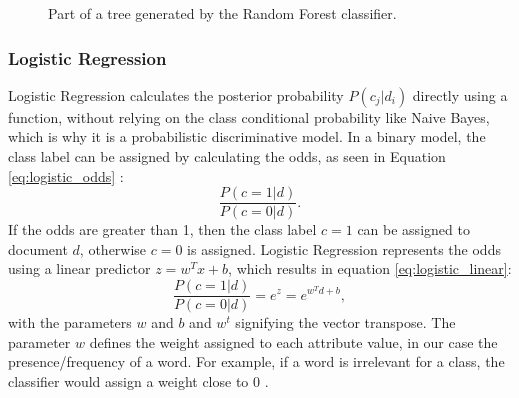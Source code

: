         \begin{figure}
        \centering
    \caption{Part of a tree generated by the Random Forest classifier.}
      \label{fig:tree}
\end{figure}
\subsubsection{Logistic Regression}

Logistic Regression calculates the posterior probability $P(c_j|d_i)$ directly using a function, without relying on the class conditional probability like Naive Bayes, which is why it is a probabilistic discriminative model. In a binary model, the class label can be assigned by calculating the odds, as seen in Equation \eqref{eq:logistic_odds} \cite{DBLP:books/aw/TanSKK2019}:
        \begin{equation}
            \label{eq:logistic_odds}
                \frac{P(c=1|d)}{P(c=0|d)}.
        \end{equation}
If the odds are greater than 1, then the class label $c=1$ can be assigned to document $d$, otherwise $c=0$ is assigned. Logistic Regression represents the odds using a linear predictor $z=w^Tx + b$, which results in equation \eqref{eq:logistic_linear}:
        \begin{equation}
            \label{eq:logistic_linear}
                \frac{P(c=1|d)}{P(c=0|d)} = e^z = e^{w^Td+b},
        \end{equation}
with the parameters $w$ and $b$ and $w^t$ signifying the vector transpose. The parameter $w$ defines the weight assigned to each attribute value, in our case the presence/frequency of a word. For example, if a word is irrelevant for a class, the classifier would assign a weight close to 0 \cite{DBLP:books/aw/TanSKK2019}. 

